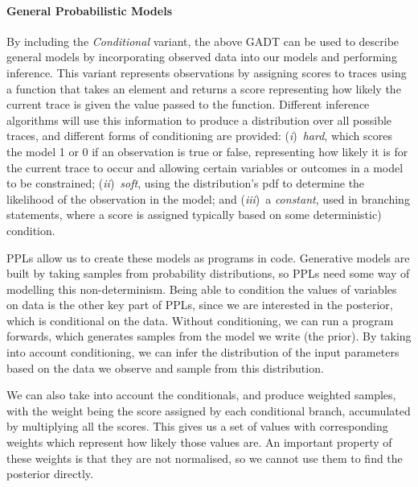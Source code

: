 \documentclass[sigconf]{acmart}
\newcommand{\one}{({\em i})\/}
\newcommand{\two}{({\em ii})\/}
\newcommand{\three}{({\em iii})\/}
\begin{document}
\paragraph{General Probabilistic Models}
By including the \emph{Conditional} variant, the above GADT can be used to describe general models by incorporating observed data into our models and performing inference. This variant represents observations by assigning scores to traces using a function that takes an element and returns a score representing how likely the current trace is given the value passed to the function. Different inference algorithms will use this information to produce a distribution over all possible traces, and different forms of conditioning are provided: \one~\emph{hard}, which scores the model 1 or 0 if an observation is true or false,  representing how likely it is for the current trace to occur and allowing certain variables or outcomes in a model to be constrained; \two~\emph{soft}, using the distribution's pdf to determine the likelihood of the observation in the model; and \three~a \emph{constant}, used in branching statements, where a score is assigned typically based on some deterministic) condition.

PPLs allow us to create these models as programs in code. Generative models are built by taking samples from probability distributions, so PPLs need some way of modelling this non-determinism. Being able to condition the values of variables on data is the other key part of PPLs, since we are interested in the posterior, which is conditional on the data. Without conditioning, we can run a program forwards, which generates samples from the model we write (the prior). By taking into account conditioning, we can infer the distribution of the input parameters based on the data we observe and sample from this distribution.

We can also take into account the conditionals, and produce weighted samples, with the weight being the score assigned by each conditional branch, accumulated by multiplying all the scores. This gives us a set of values with corresponding weights which represent how likely those values are. An important property of these weights is that they are not normalised, so we cannot use them to find the posterior directly.
\end{document}
